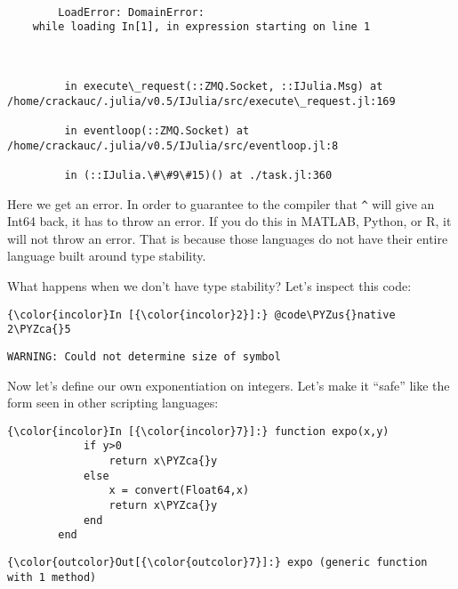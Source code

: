 \documentclass[11pt]{article}
\def\PYZus{\char`\_}
\def\PYZca{\char`\^}
\begin{document}
    \begin{Verbatim}[commandchars=\\\{\}]

        LoadError: DomainError:
    while loading In[1], in expression starting on line 1

        

         in execute\_request(::ZMQ.Socket, ::IJulia.Msg) at /home/crackauc/.julia/v0.5/IJulia/src/execute\_request.jl:169

         in eventloop(::ZMQ.Socket) at /home/crackauc/.julia/v0.5/IJulia/src/eventloop.jl:8

         in (::IJulia.\#\#9\#15)() at ./task.jl:360

    \end{Verbatim}

    Here we get an error. In order to guarantee to the compiler that
\texttt{\^{}} will give an Int64 back, it has to throw an error. If you
do this in MATLAB, Python, or R, it will not throw an error. That is
because those languages do not have their entire language built around
type stability.

    What happens when we don't have type stability? Let's inspect this code:

    \begin{Verbatim}[commandchars=\\\{\}]
{\color{incolor}In [{\color{incolor}2}]:} @code\PYZus{}native 2\PYZca{}5
\end{Verbatim}

    \begin{Verbatim}[commandchars=\\\{\}]
WARNING: Could not determine size of symbol

    \end{Verbatim}

    Now let's define our own exponentiation on integers. Let's make it
``safe'' like the form seen in other scripting languages:

    \begin{Verbatim}[commandchars=\\\{\}]
{\color{incolor}In [{\color{incolor}7}]:} function expo(x,y)
            if y>0
                return x\PYZca{}y
            else
                x = convert(Float64,x)
                return x\PYZca{}y
            end
        end
\end{Verbatim}

            \begin{Verbatim}[commandchars=\\\{\}]
{\color{outcolor}Out[{\color{outcolor}7}]:} expo (generic function with 1 method)
\end{Verbatim}
        
\end{document}
